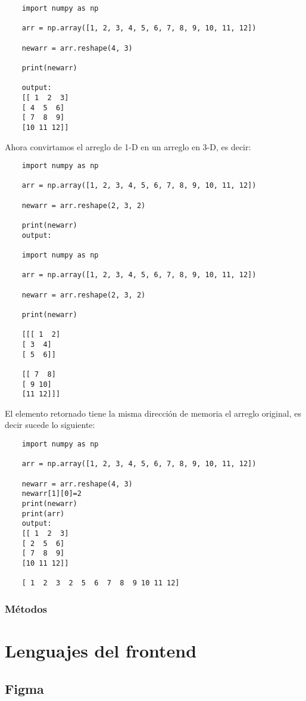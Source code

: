 \begin{verbatim}
	import numpy as np
	
	arr = np.array([1, 2, 3, 4, 5, 6, 7, 8, 9, 10, 11, 12])
	
	newarr = arr.reshape(4, 3)
	
	print(newarr)
	
	output:
	[[ 1  2  3]
	[ 4  5  6]
	[ 7  8  9]
	[10 11 12]]
\end{verbatim}

Ahora convirtamos el arreglo de 1-D en un arreglo en 3-D, es decir: 

\begin{verbatim}
	import numpy as np
	
	arr = np.array([1, 2, 3, 4, 5, 6, 7, 8, 9, 10, 11, 12])
	
	newarr = arr.reshape(2, 3, 2)
	
	print(newarr) 
	output:
	
	import numpy as np
	
	arr = np.array([1, 2, 3, 4, 5, 6, 7, 8, 9, 10, 11, 12])
	
	newarr = arr.reshape(2, 3, 2)
	
	print(newarr)
	
	[[[ 1  2]
	[ 3  4]
	[ 5  6]]
	
	[[ 7  8]
	[ 9 10]
	[11 12]]]
\end{verbatim}

El elemento retornado tiene la misma direcci\'on de memoria el arreglo original, es decir sucede lo siguiente:
\begin{verbatim}
	import numpy as np
	
	arr = np.array([1, 2, 3, 4, 5, 6, 7, 8, 9, 10, 11, 12])
	
	newarr = arr.reshape(4, 3)
	newarr[1][0]=2
	print(newarr)
	print(arr)
	output: 
	[[ 1  2  3]
	[ 2  5  6]
	[ 7  8  9]
	[10 11 12]]
	
	[ 1  2  3  2  5  6  7  8  9 10 11 12]
\end{verbatim}


\section{M\'etodos}




\part{Lenguajes del frontend}

\chapter{Figma}

